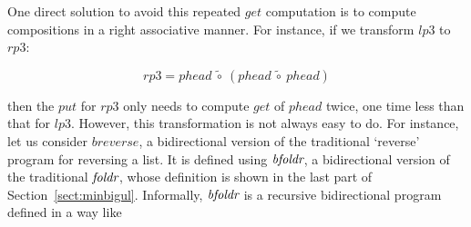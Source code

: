 



One direct solution to avoid this repeated $get$ computation is to compute compositions in a right associative manner. For instance, if we transform $lp3$ to $rp3$:\break

\minusvspacetwo
\vspace{-3mm}
\[
rp3 = phead~\tilde{\circ}~(phead~\tilde{\circ}~phead)
\]
\minusvspacetwo
\vspace{-0mm}

\noindent then the $put$ for $rp3$ only needs to compute $get$ of $phead$ twice, one time less than that for $lp3$.
However, this transformation is not always easy to do. For instance, let us consider $breverse$, a bidirectional version of the traditional `reverse' program for reversing a list. It is defined using $\mbox{\it bfoldr}$, a bidirectional version of the traditional $\mbox{\it foldr}$, whose definition  is shown in the last part of Section~\ref{sect:minbigul}. Informally, $\mbox{\it bfoldr}$ is a recursive bidirectional program defined in a way like

